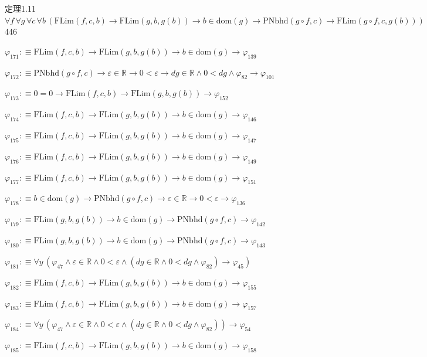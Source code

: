 \begin{fullproof}{定理1.11}{$\forall f\,\forall g\,\forall c\,\forall b\,(\mathrm{FLim}(f,c,b) \to \mathrm{FLim}(g,b,g(b)) \to b \in \mathrm{dom}(g) \to \mathrm{PNbhd}(g \circ f,c) \to \mathrm{FLim}(g \circ f,c,g(b)))$}{446}
\begin{abbrevlist}
\item $\varphi_{171} :\equiv \mathrm{FLim}(f,c,b) \to \mathrm{FLim}(g,b,g(b)) \to b \in \mathrm{dom}(g) \to \varphi_{139}$
\item $\varphi_{172} :\equiv \mathrm{PNbhd}(g \circ f,c) \to \varepsilon \in \mathbb{R} \to 0 < \varepsilon \to \mathit{dg} \in \mathbb{R} \land 0 < \mathit{dg} \land \varphi_{82} \to \varphi_{101}$
\item $\varphi_{173} :\equiv 0 = 0 \to \mathrm{FLim}(f,c,b) \to \mathrm{FLim}(g,b,g(b)) \to \varphi_{152}$
\item $\varphi_{174} :\equiv \mathrm{FLim}(f,c,b) \to \mathrm{FLim}(g,b,g(b)) \to b \in \mathrm{dom}(g) \to \varphi_{146}$
\item $\varphi_{175} :\equiv \mathrm{FLim}(f,c,b) \to \mathrm{FLim}(g,b,g(b)) \to b \in \mathrm{dom}(g) \to \varphi_{147}$
\item $\varphi_{176} :\equiv \mathrm{FLim}(f,c,b) \to \mathrm{FLim}(g,b,g(b)) \to b \in \mathrm{dom}(g) \to \varphi_{149}$
\item $\varphi_{177} :\equiv \mathrm{FLim}(f,c,b) \to \mathrm{FLim}(g,b,g(b)) \to b \in \mathrm{dom}(g) \to \varphi_{151}$
\item $\varphi_{178} :\equiv b \in \mathrm{dom}(g) \to \mathrm{PNbhd}(g \circ f,c) \to \varepsilon \in \mathbb{R} \to 0 < \varepsilon \to \varphi_{136}$
\item $\varphi_{179} :\equiv \mathrm{FLim}(g,b,g(b)) \to b \in \mathrm{dom}(g) \to \mathrm{PNbhd}(g \circ f,c) \to \varphi_{142}$
\item $\varphi_{180} :\equiv \mathrm{FLim}(g,b,g(b)) \to b \in \mathrm{dom}(g) \to \mathrm{PNbhd}(g \circ f,c) \to \varphi_{143}$
\item $\varphi_{181} :\equiv \forall y\,(\varphi_{47} \land \varepsilon \in \mathbb{R} \land 0 < \varepsilon \land (\mathit{dg} \in \mathbb{R} \land 0 < \mathit{dg} \land \varphi_{82}) \to \varphi_{45})$
\item $\varphi_{182} :\equiv \mathrm{FLim}(f,c,b) \to \mathrm{FLim}(g,b,g(b)) \to b \in \mathrm{dom}(g) \to \varphi_{155}$
\item $\varphi_{183} :\equiv \mathrm{FLim}(f,c,b) \to \mathrm{FLim}(g,b,g(b)) \to b \in \mathrm{dom}(g) \to \varphi_{157}$
\item $\varphi_{184} :\equiv \forall y\,(\varphi_{47} \land \varepsilon \in \mathbb{R} \land 0 < \varepsilon \land (\mathit{dg} \in \mathbb{R} \land 0 < \mathit{dg} \land \varphi_{82})) \to \varphi_{54}$
\item $\varphi_{185} :\equiv \mathrm{FLim}(f,c,b) \to \mathrm{FLim}(g,b,g(b)) \to b \in \mathrm{dom}(g) \to \varphi_{158}$

\end{abbrevlist}
\end{fullproof}
